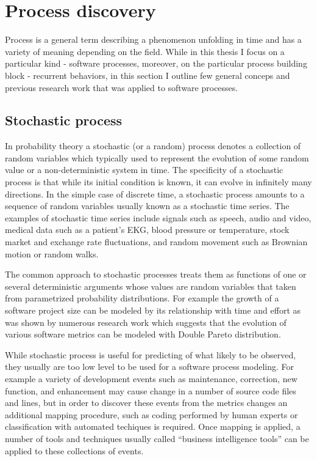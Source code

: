 \section{Process discovery}\label{process.discovery} 
Process is a general term describing a phenomenon unfolding in time and has a variety of meaning depending
on the field. While in this thesis I focus on a particular kind - software processes, moreover, on the particular process 
building block - recurrent behaviors, in this section I outline few general conceps and previous research work that 
was applied to software processes.

\subsection{Stochastic process}
In probability theory a stochastic (or a random) process denotes a collection of random variables which typically used
to represent the evolution of some random value or a non-deterministic system in time. The specificity of a stochastic 
process is that while its initial condition is known, it can evolve in infinitely many directions. 
In the simple case of discrete time, a stochastic process amounts to a sequence of random variables usually known as 
a stochastic time series. 
The examples of stochastic time series include signals such as speech, audio and video, medical data such as a 
patient's EKG, blood pressure or temperature, stock market and exchange rate fluctuations, and random movement 
such as Brownian motion or random walks.

The common approach to stochastic processes treats them as functions of one or several deterministic arguments whose 
values are random variables that taken from parametrized probability distributions. For example the growth of a software 
project size can be modeled by its relationship with time and effort as was shown by numerous research work 
\cite{citeulike:330266} \cite{citeulike:12849755} \cite{citeulike:12849753} \cite{citeulike:328047} \cite{citeulike:12849771}
which suggests that the evolution of various software metrics can be modeled with Double Pareto distribution.

While stochastic process is useful for predicting of what likely to be observed, they usually are too low level to be used for
a software process modeling. For example a variety of development events such as maintenance, correction, new function,
and enhancement may cause change in a number of source code files and lines, but in order to discover these events 
from the metrics changes an additional mapping procedure, such as coding performed by human experts or classification 
with automated techiques is required. Once mapping is applied, a number of tools and techniques usually called ``business 
intelligence tools'' can be applied to these collections of events.

